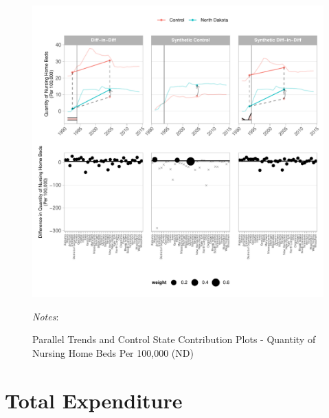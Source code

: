 \documentclass[12pt]{article}
\begin{document}
\newpage
\begin{figure}[t]
	\begin{center}
	\caption{\centering Parallel Trends and Control State Contribution Plots - Quantity of Nursing Home Beds Per 100,000 (ND)}
    \includegraphics[width=\textwidth,keepaspectratio]{q_nursing_home_beds_plots_ND.pdf}
    \end{center}
    \footnotesize
		\textit{Notes}:
\end{figure}
\clearpage

\newpage



\clearpage





\newpage
\vspace*{8cm}
\section{Total Expenditure}
\clearpage
\end{document}
